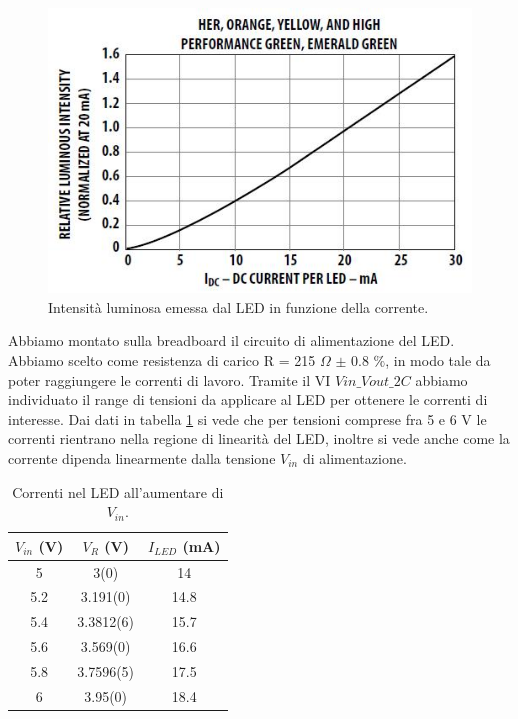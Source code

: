 \documentclass[journal, a4paper]{IEEEtran}
\begin{document}
\begin{figure}[htp]
\centering
\includegraphics[scale=.6]{hlmpc315}
\caption{Intensità luminosa emessa dal LED in funzione della corrente.}
\label{fig:hlmp}
\end{figure}

Abbiamo montato sulla breadboard il circuito di alimentazione del LED. Abbiamo scelto come resistenza di carico R = 215 $\Omega$ $\pm$ 0.8 $\%$, in modo tale da poter raggiungere le correnti di lavoro. Tramite il VI \texttt{$Vin\_Vout\_2C$} abbiamo individuato il range di tensioni da applicare al LED per ottenere le correnti di interesse. Dai dati in tabella \ref{tab:curLED} si vede che per tensioni comprese fra 5 e 6 V le correnti rientrano nella regione di linearità del LED, inoltre si vede anche come la corrente dipenda linearmente dalla tensione $V_{in}$ di alimentazione.

\begin{table}
\centering
\caption{Correnti nel LED all'aumentare di $V_{in}$.}
\label{tab:curLED}
\begin{tabular}{|c|c|c|}
\hline 
$V_{in}$ (V) & $V_R$ (V)& $I_{LED}$ (mA)\\ 
\hline 
5 & 3(0) & 14 \\ 
\hline 
5.2 & 3.191(0)& 14.8 \\ 
\hline 
5.4 & 3.3812(6) & 15.7 \\ 
\hline 
5.6 & 3.569(0) & 16.6 \\ 
\hline 
5.8 & 3.7596(5) & 17.5 \\ 
\hline 
6 & 3.95(0) & 18.4 \\ 
\hline 
\end{tabular} 
\end{table}
\end{document}
